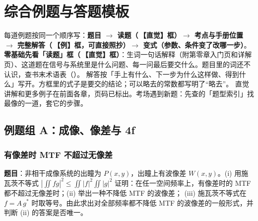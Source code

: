 \providecommand{\rd}[2]{（入门 \pageref{#1}，详见 \pageref{#2}）}
\providecommand{\rdd}[1]{（详见 \pageref{#1}）}
\chapter{综合例题与答题模板}\label{ch:examples}

\begin{idea}[怎么用这一章]
每道例题按同一个顺序写：\textbf{题目 $\to$ 读题（\icoI\,【直觉】框）$\to$ 考点与手册位置 $\to$ 完整解答（\icoE\,【例】框，可直接照抄）$\to$ 变式（参数、条件变了改哪一步）}。
\textbf{零基础先看「读题」框（\icoI\,【直觉】框）}：生词一句话解释（附第零章入门页和详解页）、这道题在信号与系统里是什么问题、每一问最后要交什么。题目里的词还不认识，查书末术语表（\pageref{tab:glossary}）。
解答按「手上有什么、下一步为什么这样做、得到什么」写开。方框里的式子是要交的结论；可以略去的常数都写明了“略去”。
直觉讲解和更多例子在前面各章，页码已标出。考场遇到新题：先查\pageref{tab:typeindex}的「题型索引」找最像的一道，套它的步骤。
\end{idea}

\section{例题组 A：成像、像差与 4f}\label{sec:exgA}

\subsection{有像差时 MTF 不超过无像差}\label{ex:v-mtf}
\noindent\textbf{题目}：非相干成像系统的出瞳为 $P(x,y)$，出瞳上有波像差 $W(x,y)$。(i) 用施瓦茨不等式
$\left|\iint fg\right|^2\le\iint|f|^2\iint|g|^2$ 证明：在任一空间频率上，有像差时的 MTF 都不超过无像差时；(ii) 举出一种不降低 MTF 的波像差；
(iii) 施瓦茨不等式在 $f=A\,g^*$ 时取等号。由此求出对全部频率都不降低 MTF 的波像差的一般形式，并判断 (ii) 的答案是否唯一。

